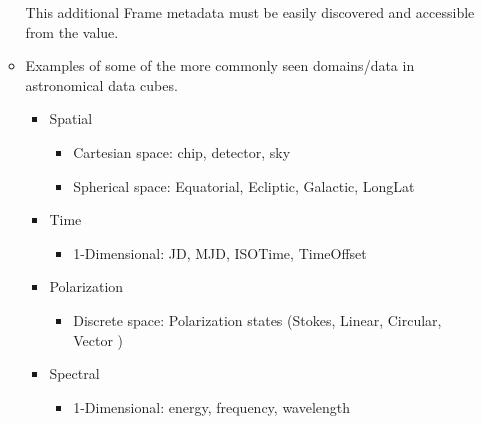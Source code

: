 \documentclass[11pt,a4paper]{ivoa}
\begin{document}
\begin{itemize}
\begin{itemize}
             This additional Frame metadata must be easily discovered and accessible from the value.
       \item Examples of some of the more commonly seen domains/data in astronomical data cubes.
       \begin{itemize}      
          \item Spatial
          \begin{itemize}
             \item Cartesian space:  chip, detector, sky
             \item Spherical space: Equatorial, Ecliptic, Galactic, LongLat
          \end{itemize}
          \item Time
          \begin{itemize}
             \item 1-Dimensional: JD, MJD, ISOTime, TimeOffset
          \end{itemize}
          \item Polarization
          \begin{itemize}
             \item Discrete space: Polarization states (Stokes, Linear, Circular, Vector )
          \end{itemize}
          \item Spectral
          \begin{itemize}
             \item 1-Dimensional: energy, frequency, wavelength
          \end{itemize}
       \end{itemize}
    \end{itemize}
  \end{itemize}
\end{document}
